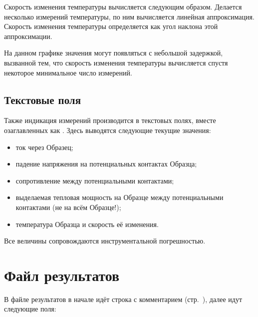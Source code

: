 \documentclass[12pt, a4paper, twocolumn]{report}
\begin{document}
Скорость изменения температуры вычисляется следующим образом. Делается несколько измерений температуры, по ним вычисляется линейная аппроксимация. Скорость изменения температуры определяется как угол наклона этой аппроксимации.

На данном графике значения могут появляться с небольшой задержкой, вызванной тем, что скорость изменения температуры вычисляется спустя некоторое минимальное число измерений.

\subsection{Текстовые поля}

Также индикация измерений производится в текстовых полях, вместе озаглавленных как . Здесь выводятся следующие текущие значения:

\begin{itemize}
\item ток через Образец;
\item падение напряжения на потенциальных контактах Образца;
\item сопротивление между потенциальными контактами;
\item выделаемая тепловая мощность на Образце между потенциальными контактами (не на всём Образце!);
\item температура Образца и скорость её изменения.
\end{itemize}

Все величины сопровождаются инструментальной погрешностью.

\section{Файл результатов}

В файле результатов в начале идёт строка с комментарием (стр.~\pageref{sec_dut_comment}), далее идут следующие поля:
\end{document}
